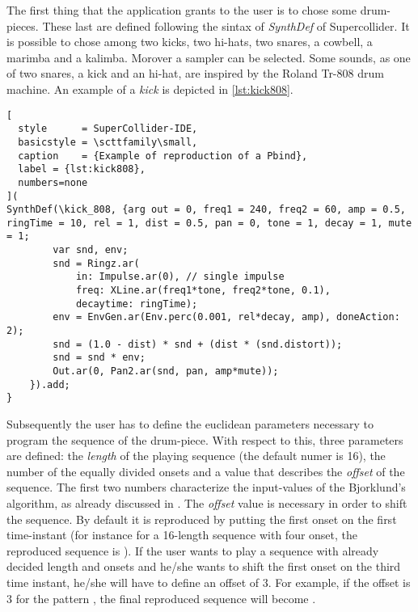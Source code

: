 \documentclass[main.tex]{subfiles}
\begin{document}
The first thing that the application grants to the user is to chose some drum-pieces. These last are defined following the sintax of \textit{SynthDef} of Supercollider. It is possible to chose among two kicks, two hi-hats, two snares, a cowbell, a marimba and a kalimba. Morover a sampler can be selected. Some sounds, as one of two snares, a kick and an hi-hat, are inspired by the Roland Tr-808 drum machine. An example of a \textit{kick} is depicted in \autoref{lst:kick808}.\\
\begin{lstlisting}[
  style      = SuperCollider-IDE,
  basicstyle = \scttfamily\small,
  caption    = {Example of reproduction of a Pbind},
  label = {lst:kick808},
  numbers=none
](
SynthDef(\kick_808, {arg out = 0, freq1 = 240, freq2 = 60, amp = 0.5, ringTime = 10, rel = 1, dist = 0.5, pan = 0, tone = 1, decay = 1, mute = 1;
		var snd, env;
		snd = Ringz.ar(
			in: Impulse.ar(0), // single impulse
			freq: XLine.ar(freq1*tone, freq2*tone, 0.1),
			decaytime: ringTime);
		env = EnvGen.ar(Env.perc(0.001, rel*decay, amp), doneAction: 2);
		snd = (1.0 - dist) * snd + (dist * (snd.distort));
		snd = snd * env;
		Out.ar(0, Pan2.ar(snd, pan, amp*mute));
	}).add;
}
\end{lstlisting}
Subsequently the user has to define the euclidean parameters necessary to program the sequence of the drum-piece. With respect to this, three parameters are defined: the \textit{length} of the playing sequence (the default numer is 16), the number of the equally divided onsets and a value that describes the \textit{offset} of the sequence. The first two numbers characterize the input-values of the Bjorklund's algorithm, as already discussed in . The \textit{offset} value is necessary in order to shift the sequence. By default it is reproduced by putting the first onset on the first time-instant (for instance for a 16-length sequence with four onset, the reproduced sequence is \begin{math}[1000100010001000]\end{math}). If the user wants to play a sequence with already decided length and onsets and he/she wants to shift the first onset on the third time instant, he/she will have to define an offset of \begin{math}3\end{math}. For example, if the offset is \begin{math}3\end{math} for the pattern \begin{math}[1000100010001000]\end{math}, the final reproduced sequence will become \begin{math}[0001000100010001]\end{math}.\\
\end{document}
